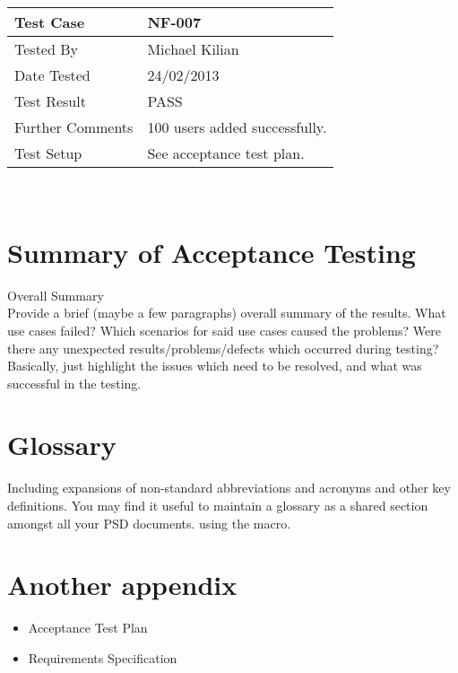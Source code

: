 \documentclass{l3deliverable}
\begin{document}
\begin{tabular}{lp{10cm}}
\hline 
\textbf{Test Case} & NF-007\tabularnewline
\hline 
\hline 
Tested By & Michael Kilian\tabularnewline
\hline 
Date Tested & 24/02/2013\tabularnewline
\hline 
Test Result & PASS\tabularnewline
\hline
Further Comments & 100 users added successfully.\tabularnewline
\hline
Test Setup & See acceptance test plan.\tabularnewline
\hline
\end{tabular}\\
\section{Summary of Acceptance Testing}
Overall Summary \\
Provide a brief (maybe a few paragraphs) overall summary of the results. What use cases failed? Which scenarios for said use cases caused the problems? Were there any unexpected results/problems/defects which occurred during testing? Basically, just highlight the issues which need to be resolved, and what was successful in the testing. 

\appendix

\section{Glossary}

Including expansions of non-standard abbreviations and acronyms and
other key definitions.  You may find it useful to maintain a glossary
as a shared section amongst all your PSD documents. using the
\verb!! macro.

\section{Another appendix}
\begin{itemize}
\item{Acceptance Test Plan}
\item{Requirements Specification}
\end{itemize}
\end{document}
